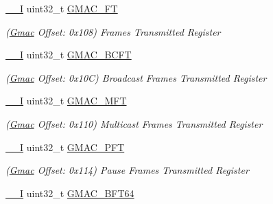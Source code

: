 \begin{DoxyCompactItemize}
\mbox{\hyperlink{core__cm7_8h_af63697ed9952cc71e1225efe205f6cd3}{\+\_\+\+\_\+I}} uint32\+\_\+t \mbox{\hyperlink{structGmac_ab035488f3f19ba653b3d9430d4ec82a4}{G\+M\+A\+C\+\_\+\+FT}}
\begin{DoxyCompactList}\small\item\em (\mbox{\hyperlink{structGmac}{Gmac}} Offset\+: 0x108) Frames Transmitted Register \end{DoxyCompactList}\item 
\mbox{\label{structGmac_a6a00d06438b6011ea64558e3e8b65215}} 
\mbox{\hyperlink{core__cm7_8h_af63697ed9952cc71e1225efe205f6cd3}{\+\_\+\+\_\+I}} uint32\+\_\+t \mbox{\hyperlink{structGmac_a6a00d06438b6011ea64558e3e8b65215}{G\+M\+A\+C\+\_\+\+B\+C\+FT}}
\begin{DoxyCompactList}\small\item\em (\mbox{\hyperlink{structGmac}{Gmac}} Offset\+: 0x10C) Broadcast Frames Transmitted Register \end{DoxyCompactList}\item 
\mbox{\label{structGmac_af4c1a23f1cbaf78d9b291c11d8f33c83}} 
\mbox{\hyperlink{core__cm7_8h_af63697ed9952cc71e1225efe205f6cd3}{\+\_\+\+\_\+I}} uint32\+\_\+t \mbox{\hyperlink{structGmac_af4c1a23f1cbaf78d9b291c11d8f33c83}{G\+M\+A\+C\+\_\+\+M\+FT}}
\begin{DoxyCompactList}\small\item\em (\mbox{\hyperlink{structGmac}{Gmac}} Offset\+: 0x110) Multicast Frames Transmitted Register \end{DoxyCompactList}\item 
\mbox{\label{structGmac_a32c427ab2d259ba53c75a81a2e4e1a7a}} 
\mbox{\hyperlink{core__cm7_8h_af63697ed9952cc71e1225efe205f6cd3}{\+\_\+\+\_\+I}} uint32\+\_\+t \mbox{\hyperlink{structGmac_a32c427ab2d259ba53c75a81a2e4e1a7a}{G\+M\+A\+C\+\_\+\+P\+FT}}
\begin{DoxyCompactList}\small\item\em (\mbox{\hyperlink{structGmac}{Gmac}} Offset\+: 0x114) Pause Frames Transmitted Register \end{DoxyCompactList}\item 
\mbox{\label{structGmac_a6286dce15478c36ab59751ed0cc3fd29}} 
\mbox{\hyperlink{core__cm7_8h_af63697ed9952cc71e1225efe205f6cd3}{\+\_\+\+\_\+I}} uint32\+\_\+t \mbox{\hyperlink{structGmac_a6286dce15478c36ab59751ed0cc3fd29}{G\+M\+A\+C\+\_\+\+B\+F\+T64}}

\end{DoxyCompactItemize}
